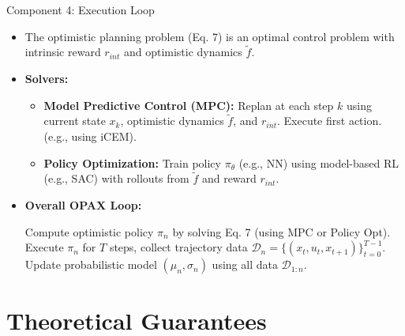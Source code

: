 \documentclass[11pt,aspectratio=169,handout]{beamer} %
\DeclareMathOperator*{\argmax}{arg\,max}
\begin{document}
\begin{frame}{Component 4: Execution Loop}
    \begin{itemize}
        \item The optimistic planning problem (Eq. 7) is an optimal control problem with intrinsic reward $r_{int}$ and optimistic dynamics $\tilde{f}$.
        \item \textbf{Solvers:}
        \begin{itemize}
            \item \textbf{Model Predictive Control (MPC):} Replan at each step $k$ using current state $x_k$, optimistic dynamics $\tilde{f}$, and $r_{int}$. Execute first action. (e.g., using iCEM).
            \item \textbf{Policy Optimization:} Train policy $\pi_\theta$ (e.g., NN) using model-based RL (e.g., SAC) with rollouts from $\tilde{f}$ and reward $r_{int}$.
        \end{itemize}
        \pause
        \item \textbf{Overall OPAX Loop:}
        \begin{algorithmic}[1] %
                \State Compute optimistic policy $\pi_n$ by solving Eq. 7 (using MPC or Policy Opt).
                \State Execute $\pi_n$ for $T$ steps, collect trajectory data $\mathcal{D}_n = \{ (x_t, u_t, x_{t+1}) \}_{t=0}^{T-1}$.
                \State Update probabilistic model $(\mu_n, \sigma_n)$ using all data $\mathcal{D}_{1:n}$.
            \EndFor
        \end{algorithmic}
    \end{itemize}
\end{frame}

\section{Theoretical Guarantees}



\end{document}
